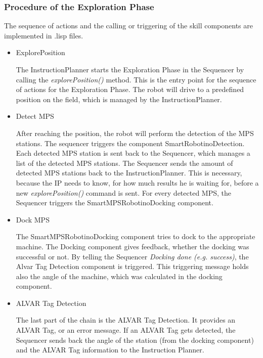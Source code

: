 \subsubsection{Procedure of the Exploration Phase}

The sequence of actions and the calling or triggering of the skill components are implemented in .lisp files.

\begin{itemize}

\item ExplorePosition

The InstructionPlanner starts the Exploration Phase in the Sequencer by calling the \textit{explorePosition()} method. This is the entry point for the sequence of actions for the Exploration Phase. The robot will drive to a predefined position on the field, which is managed by the InstructionPlanner.  

\item Detect MPS

After reaching the position, the robot will perform the detection of the MPS stations. The sequencer triggers the component SmartRobotinoDetection.
Each detected MPS station is sent back to the Sequencer, which manages a list of the detected MPS stations. 
The Sequencer sends the amount of detected MPS stations back to the InstructionPlanner. This is necessary, because the IP needs to know, for how much results he is waiting for, before a new \textit{explorePosition()} command is sent.
For every detected MPS, the Sequencer triggers the SmartMPSRobotinoDocking component.

\item Dock MPS

The SmartMPSRobotinoDocking component tries to dock to the appropriate machine. 
The Docking component gives feedback, whether the docking was successful or not. By telling the Sequencer \textit{Docking done (e.g. success)}, the Alvar Tag Detection component is triggered. This triggering message holds also the angle of the machine, which was calculated in the docking component.

\item ALVAR Tag Detection

The last part of the chain is the ALVAR Tag Detection. It provides an ALVAR Tag, or an error message. 
If an ALVAR Tag gets detected, the Sequencer sends back the angle of the station (from the docking component) and the ALVAR Tag information to the Instruction Planner.

\end{itemize}

